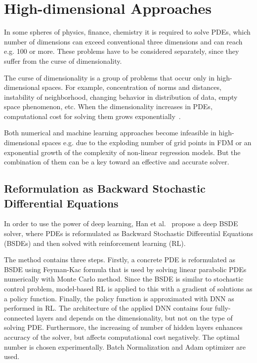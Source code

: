 \section{High-dimensional Approaches}
\label{sec:highdim}
In some spheres of physics, finance, chemistry it is required to solve PDEs, which number of dimensions can exceed conventional three dimensions and can reach e.g. 100 or more. These problems have to be considered separately, since they suffer from the curse of dimensionality. 

The curse of dimensionality is a group of problems that occur only in high-dimensional spaces. For example, concentration of norms and distances, instability of neighborhood, changing behavior in distribution of data, empty space phenomenon, etc. When the dimensionality increases in PDEs, computational cost for solving them grows exponentially~\cite{bellman}. 

Both numerical and machine learning approaches become infeasible in high-dimensional spaces e.g. due to the exploding number of grid points in FDM or an exponential growth of the complexity of non-linear regression models. But the combination of them can be a key toward an effective and accurate solver. 

\subsection{Reformulation as Backward Stochastic Differential Equations}
In order to use the power of deep learning, Han et al.~\cite{Han18, Weinan17} propose a deep BSDE solver, where PDEs is reformulated as Backward Stochastic Differential Equations (BSDEs) and then solved with reinforcement learning (RL). 

The method contains three steps. Firstly, a concrete PDE is reformulated as BSDE using Feyman-Kac formula that is used by solving linear parabolic PDEs numerically with Monte Carlo method. Since the BSDE is similar to stochastic control problem, model-based RL is applied to this with a gradient of solutions as a policy function. Finally, the policy function is approximated with DNN as performed in RL. The architecture of the applied DNN contains four fully-connected layers and depends on the dimensionality, but not on the type of solving PDE. Furthermore, the increasing of number of hidden layers enhances accuracy of the solver, but affects computational cost negatively. The optimal number is chosen experimentally. Batch Normalization and Adam optimizer are used.  

